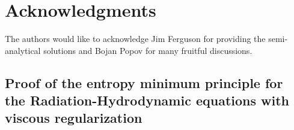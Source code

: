 \documentclass[review]{elsarticle}
\begin{document}
\section*{Acknowledgments}
The authors would like to acknowledge Jim Ferguson for providing the semi-analytical solutions and Bojan Popov for many fruitful discussions. 

\newpage
\begin{appendices}
\section{Proof of the entropy minimum principle for the Radiation-Hydrodynamic equations with viscous regularization}
\label{app:appendixA}


\end{appendices}
\end{document}
